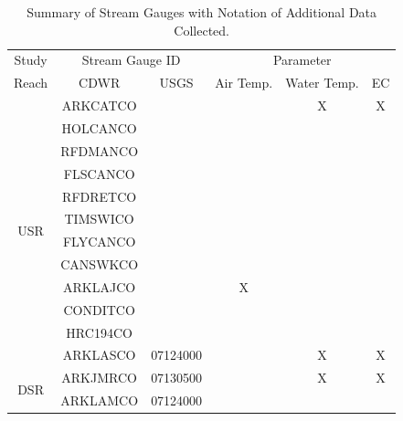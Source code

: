 \begin{table}[htbp]
  \centering
  \caption[Summary of Stream Gauges with Notation of Additional Data Collected.]{Summary of Stream Gauges with Notation of Additional Data Collected.}
  \label{tab:gauge other data}
  \begin{tabular}{cccccc}
  	\toprule
  	        Study         & \multicolumn{2}{c}{Stream Gauge ID} & \multicolumn{3}{c}{Parameter} \\
  	        Reach         &   CDWR    &          USGS           & Air Temp. & Water Temp. & EC  \\ \toprule
  	\multirow{12}{*}{USR} & ARKCATCO  &                         &           &      X      &  X  \\
  	                      & HOLCANCO  &                         &           &             &  \\
  	                      & RFDMANCO  &                         &           &             &  \\
  	                      & FLSCANCO  &                         &           &             &  \\
  	                      & RFDRETCO  &                         &           &             &  \\
  	                      & TIMSWICO  &                         &           &             &  \\
  	                      & FLYCANCO  &                         &           &             &  \\
  	                      & CANSWKCO  &                         &           &             &  \\
  	                      & ARKLAJCO  &                         &     X     &             &  \\
  	                      & CONDITCO  &                         &           &             &  \\
  	                      & HRC194CO  &                         &           &             &  \\
  	                      & ARKLASCO  &        07124000         &           &      X      &  X  \\ \midrule
  	\multirow{7}{*}{DSR}  & ARKJMRCO  &        07130500         &           &      X      &  X  \\
  	                      & ARKLAMCO  &        07124000         &           &             &  \\

\end{tabular}
\end{table}
